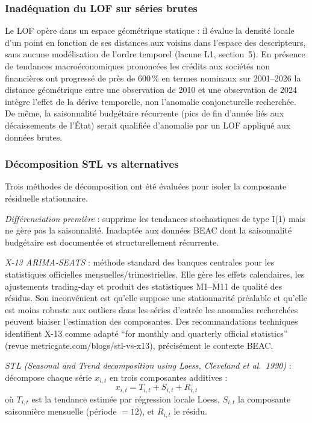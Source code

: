 \documentclass[12pt,a4paper]{article}
\begin{document}
\subsubsection{Inadéquation du LOF sur séries brutes}

Le LOF opère dans un espace géométrique statique : il évalue la densité locale
d'un point en fonction de ses distances aux voisins dans l'espace des
descripteurs, sans aucune modélisation de l'ordre temporel (lacune L1,
section~5). En présence de tendances macroéconomiques prononcées  les
crédits aux sociétés non financières ont progressé de près de 600\,\% en
termes nominaux sur 2001--2026  la distance géométrique entre une
observation de 2010 et une observation de 2024 intègre l'effet de la dérive
temporelle, non l'anomalie conjoncturelle recherchée. De même, la saisonnalité
budgétaire récurrente (pics de fin d'année liés aux décaissements de l'État)
serait qualifiée d'anomalie par un LOF appliqué aux données brutes.

\subsubsection{Décomposition STL vs alternatives}

Trois méthodes de décomposition ont été évaluées pour isoler la composante
résiduelle stationnaire.

\textit{Différenciation première} : supprime les tendances stochastiques de
type I(1) mais ne gère pas la saisonnalité. Inadaptée aux données BEAC dont
la saisonnalité budgétaire est documentée et structurellement récurrente.

\textit{X-13 ARIMA-SEATS} : méthode standard des banques centrales pour les
statistiques officielles mensuelles/trimestrielles. Elle gère les effets
calendaires, les ajustements trading-day et produit des statistiques M1--M11
de qualité des résidus. Son inconvénient est qu'elle suppose une stationnarité
préalable et qu'elle est moins robuste aux outliers dans les séries d'entrée
 les anomalies recherchées peuvent biaiser l'estimation des composantes.
Des recommandations techniques identifient X-13 comme adapté ``for monthly
and quarterly official statistics'' (revue metricgate.com/blogs/stl-vs-x13),
précisément le contexte BEAC.

\textit{STL (Seasonal and Trend decomposition using Loess, Cleveland et al.\
1990)} : décompose chaque série $x_{i,t}$ en trois composantes additives :
$$x_{i,t} = T_{i,t} + S_{i,t} + R_{i,t}$$
où $T_{i,t}$ est la tendance estimée par régression locale Loess, $S_{i,t}$
la composante saisonnière mensuelle (période $= 12$), et $R_{i,t}$ le résidu.
\end{document}
